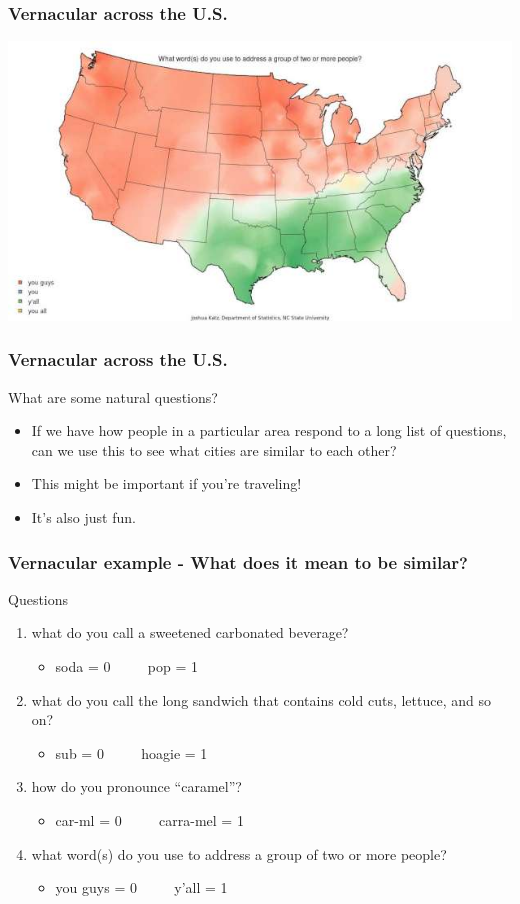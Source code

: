\documentclass{beamer} %
\newcommand{\1}{\mathbb{1}}
\begin{document}
\begin{frame}[t]\frametitle{Vernacular across the U.S.}
\includegraphics[scale = 0.4]{./visualization/you_all.jpg}
\end{frame}

\begin{frame}[t]\frametitle{Vernacular across the U.S.}
What are some natural questions?
\begin{itemize}
	\item If we have how people in a particular area respond to a long list of questions, can we use this to see what cities are similar to each other?
	\item This might be important if you're traveling!
	\item It's also just fun. 
\end{itemize}
\end{frame}


\begin{frame}[t]\frametitle{Vernacular example - What does it mean to be similar?}
	Questions
	\begin{enumerate}
\item what do you call a sweetened carbonated beverage? 
	 	\begin{itemize}
	 		\item soda = 0 $\qquad$ pop = 1
	 	\end{itemize}
	 	\item what do you call the long sandwich that contains cold cuts, lettuce, and so on?
	 	\begin{itemize}
	 		\item sub = 0 $\qquad$ hoagie = 1
	 	\end{itemize}
	 	\item how do you pronounce ``caramel''? 
	 	\begin{itemize}
	 		\item car-ml = 0 $\qquad$ carra-mel = 1
	 	\end{itemize}
	 	\item what word(s) do you use to address a group of two or more people?
	 	\begin{itemize}
	 		\item you guys = 0 $\qquad$ y'all = 1
	 	\end{itemize}
	 \end{enumerate} 
\end{frame}
\end{document}
